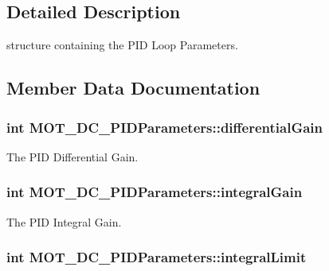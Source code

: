 \subsection{Detailed Description}
structure containing the P\+ID Loop Parameters. 



\subsection{Member Data Documentation}
\subsubsection[{\texorpdfstring{differential\+Gain}{differentialGain}}]{\setlength{\rightskip}{0pt plus 5cm}int M\+O\+T\+\_\+\+D\+C\+\_\+\+P\+I\+D\+Parameters\+::differential\+Gain}\hypertarget{struct_m_o_t___d_c___p_i_d_parameters_ad66ecfc0d02a8192860814496e1b60d7}{}\label{struct_m_o_t___d_c___p_i_d_parameters_ad66ecfc0d02a8192860814496e1b60d7}


The P\+ID Differential Gain. 

\subsubsection[{\texorpdfstring{integral\+Gain}{integralGain}}]{\setlength{\rightskip}{0pt plus 5cm}int M\+O\+T\+\_\+\+D\+C\+\_\+\+P\+I\+D\+Parameters\+::integral\+Gain}\hypertarget{struct_m_o_t___d_c___p_i_d_parameters_aa6c6c1c529672889ed288bf9ee9219c5}{}\label{struct_m_o_t___d_c___p_i_d_parameters_aa6c6c1c529672889ed288bf9ee9219c5}


The P\+ID Integral Gain. 

\subsubsection[{\texorpdfstring{integral\+Limit}{integralLimit}}]{\setlength{\rightskip}{0pt plus 5cm}int M\+O\+T\+\_\+\+D\+C\+\_\+\+P\+I\+D\+Parameters\+::integral\+Limit}\hypertarget{struct_m_o_t___d_c___p_i_d_parameters_a72ad0a8a97974309738cc07a0782e99d}{}\label{struct_m_o_t___d_c___p_i_d_parameters_a72ad0a8a97974309738cc07a0782e99d}



